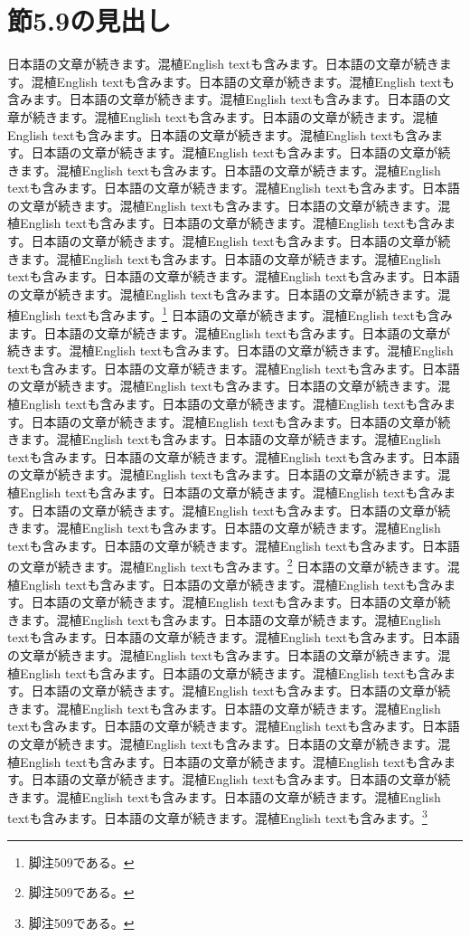 \documentclass[pdflatex,book]{jlreq}
\begin{document}
\section{節5.9の見出し}
日本語の文章が続きます。混植English textも含みます。日本語の文章が続きます。混植English textも含みます。日本語の文章が続きます。混植English textも含みます。日本語の文章が続きます。混植English textも含みます。日本語の文章が続きます。混植English textも含みます。日本語の文章が続きます。混植English textも含みます。日本語の文章が続きます。混植English textも含みます。日本語の文章が続きます。混植English textも含みます。日本語の文章が続きます。混植English textも含みます。日本語の文章が続きます。混植English textも含みます。日本語の文章が続きます。混植English textも含みます。日本語の文章が続きます。混植English textも含みます。日本語の文章が続きます。混植English textも含みます。日本語の文章が続きます。混植English textも含みます。日本語の文章が続きます。混植English textも含みます。日本語の文章が続きます。混植English textも含みます。日本語の文章が続きます。混植English textも含みます。日本語の文章が続きます。混植English textも含みます。日本語の文章が続きます。混植English textも含みます。日本語の文章が続きます。混植English textも含みます。\footnote{脚注509である。}
日本語の文章が続きます。混植English textも含みます。日本語の文章が続きます。混植English textも含みます。日本語の文章が続きます。混植English textも含みます。日本語の文章が続きます。混植English textも含みます。日本語の文章が続きます。混植English textも含みます。日本語の文章が続きます。混植English textも含みます。日本語の文章が続きます。混植English textも含みます。日本語の文章が続きます。混植English textも含みます。日本語の文章が続きます。混植English textも含みます。日本語の文章が続きます。混植English textも含みます。日本語の文章が続きます。混植English textも含みます。日本語の文章が続きます。混植English textも含みます。日本語の文章が続きます。混植English textも含みます。日本語の文章が続きます。混植English textも含みます。日本語の文章が続きます。混植English textも含みます。日本語の文章が続きます。混植English textも含みます。日本語の文章が続きます。混植English textも含みます。日本語の文章が続きます。混植English textも含みます。日本語の文章が続きます。混植English textも含みます。日本語の文章が続きます。混植English textも含みます。\footnote{脚注509である。}
日本語の文章が続きます。混植English textも含みます。日本語の文章が続きます。混植English textも含みます。日本語の文章が続きます。混植English textも含みます。日本語の文章が続きます。混植English textも含みます。日本語の文章が続きます。混植English textも含みます。日本語の文章が続きます。混植English textも含みます。日本語の文章が続きます。混植English textも含みます。日本語の文章が続きます。混植English textも含みます。日本語の文章が続きます。混植English textも含みます。日本語の文章が続きます。混植English textも含みます。日本語の文章が続きます。混植English textも含みます。日本語の文章が続きます。混植English textも含みます。日本語の文章が続きます。混植English textも含みます。日本語の文章が続きます。混植English textも含みます。日本語の文章が続きます。混植English textも含みます。日本語の文章が続きます。混植English textも含みます。日本語の文章が続きます。混植English textも含みます。日本語の文章が続きます。混植English textも含みます。日本語の文章が続きます。混植English textも含みます。日本語の文章が続きます。混植English textも含みます。\footnote{脚注509である。}
\end{document}
